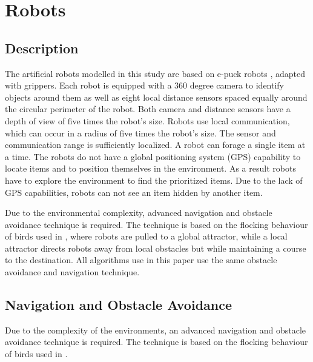 
\chapter{Robots}
\label{chap:robots}


\section{Description}

The artificial robots modelled in this study are based on e-puck robots \cite{mondada2009puck}, adapted with grippers. Each robot is equipped with a 360 degree camera to identify objects around them as well as eight local distance sensors spaced equally around the circular perimeter of the robot. Both camera and distance sensors have a depth of view of five times the robot's size. Robots use local communication, which can occur in a radius of five times the robot's size. The sensor and communication range is sufficiently localized. A robot can forage a single item at a time. The robots do not have a global positioning system (GPS) capability to locate items and to position themselves in the environment. As a result robots have to explore the environment to find the prioritized items. Due to the lack of GPS capabilities, robots can not see an item hidden by another item.

Due to the environmental complexity, advanced navigation and obstacle avoidance technique is required. The technique is based on the flocking behaviour of birds used in \cite{antoniou2012congestion}, where robots are pulled to a global attractor, while a local attractor directs robots away from local obstacles but while maintaining a course to the destination. All algorithms use in this paper use the same obstacle avoidance and navigation technique. 

\section{Navigation and Obstacle Avoidance}
\label{robots:obstacleavoidance}

Due to the complexity of the environments, an advanced navigation and obstacle avoidance technique is required.  The technique is based on the flocking behaviour of birds used in \cite{antoniou2012congestion}.

